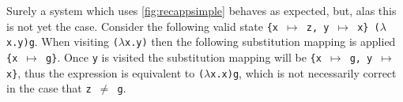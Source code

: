 \documentclass[11pt,oneside,a4paper]{report}
\begin{document}
Surely a system which uses \autoref{fig:recappsimple} behaves as expected, but, alas this is not yet the case.
Consider the following valid state \texttt{\{x $\mapsto$ z, y $\mapsto$ x\} ($\lambda$x.y)g}.
When visiting \texttt{($\lambda$x.y)} then the following substitution mapping is applied \texttt{\{x $\mapsto$ g\}}.
Once \texttt{y} is visited the substitution mapping will be \texttt{\{x $\mapsto$ g, y $\mapsto$ x\}}, thus the expression is equivalent to \texttt{($\lambda$x.x)g}, which is not necessarily correct in the case that \texttt{z $\neq$ g}.

\end{document}

